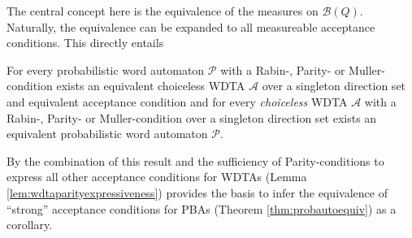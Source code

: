 The central concept here is the equivalence of the measures on 
$\mathcal{B}(Q)$. Naturally, the equivalence can be expanded to all measureable
acceptance conditions. This directly entails
\begin{corollary}
  For every probabilistic word automaton $\mathcal{P}$ with a Rabin-, Parity- 
  or Muller-condition exists an equivalent choiceless \ac{WDTA} $\mathcal{A}$ 
  over a singleton direction set and equivalent acceptance condition and for 
  every \emph{choiceless} \ac{WDTA} $\mathcal{A}$ with a Rabin-, Parity- or
  Muller-condition over a singleton direction set exists an equivalent
  probabilistic word automaton $\mathcal{P}$.
\end{corollary}
By the combination of this result and the sufficiency of Parity-conditions to
express all other acceptance conditions for \acp{WDTA} (Lemma 
\ref{lem:wdtaparityexpressiveness}) provides the basis to infer the equivalence 
of \enquote{strong} acceptance conditions for \acp{PBA} (Theorem 
\ref{thm:probautoequiv}) as a corollary.

